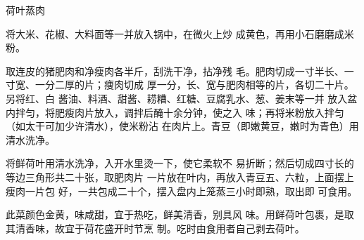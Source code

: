 \begin{recipe}{荷叶蒸肉}

\ingredients


\cooking

\step 将大米、花椒、大料面等一并放入锅中，在微火上炒 成黄色，再用小石磨磨成米粉。

\step 取连皮的猪肥肉和净瘦肉各半斤，刮洗干净，拈净残 毛。肥肉切成一寸半长、一寸宽、一分二厚的片；痩肉切成 厚一分，长、宽与肥肉相等的片，各切二十片。另将红、白 酱油、料酒、甜酱、耢糟、红糖、豆腐乳水、葱、姜末等一并 放入盆内拌匀，将肥瘦肉片放入，调拌后醃十余分钟，使之入 味；再将米粉放入拌匀（如太干可加少许清水），使米粉沾 在肉片上。青豆（即嫩黄豆，嫩时为青色）用清水洗净。

\step 将鲜荷叶用清水洗净，入开水里烫一下，使它柔软不 易折断；然后切成四寸长的等边三角形共二十张，取肥肉片 一片放在叶内，再放入青豆五、六粒，上面摆上瘦肉一片包 好，一共包成二十个，摆入盘内上笼蒸三小时即熟，取出即 可食用。

\notes

此菜颜色金黄，味咸甜，宜于热吃，鲜美清香，别具风 味。用鲜荷叶包裹，是取其清香味，故宜于荷花盛开时节烹 制。吃时由食用者自己剥去荷叶。

\end{recipe}

